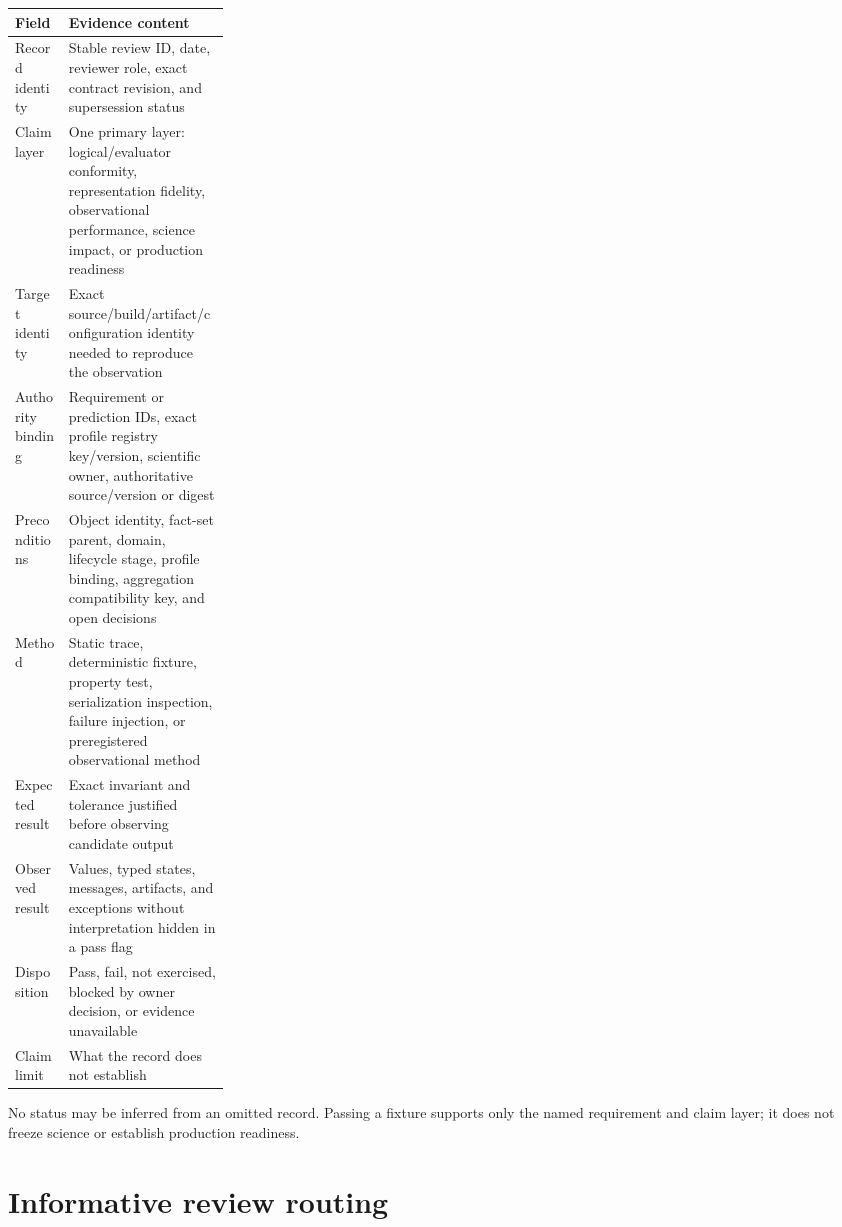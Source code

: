 \documentclass[10pt]{article}
\begin{document}
\begin{tabularx}{\linewidth}{@{}p{0.25\linewidth}X@{}}
\toprule
Field & Evidence content \\
\midrule
Record identity & Stable review ID, date, reviewer role, exact contract
revision, and supersession status \\
Claim layer & One primary layer: logical/evaluator conformity,
representation fidelity, observational performance, science impact, or
production readiness \\
Target identity & Exact source/build/artifact/configuration identity needed to
reproduce the observation \\
Authority binding & Requirement or prediction IDs, exact profile registry
key/version, scientific owner, authoritative source/version or digest \\
Preconditions & Object identity, fact-set parent, domain, lifecycle stage,
profile binding, aggregation compatibility key, and open decisions \\
Method & Static trace, deterministic fixture, property test, serialization
inspection, failure injection, or preregistered observational method \\
Expected result & Exact invariant and tolerance justified before observing
candidate output \\
Observed result & Values, typed states, messages, artifacts, and exceptions
without interpretation hidden in a pass flag \\
Disposition & Pass, fail, not exercised, blocked by owner decision, or
evidence unavailable \\
Claim limit & What the record does not establish \\
\bottomrule
\end{tabularx}

No status may be inferred from an omitted record. Passing a fixture supports
only the named requirement and claim layer; it does not freeze science or
establish production readiness.

\section{Informative review routing}
\label{sec:eng-routing}
\end{document}
